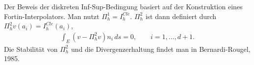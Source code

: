 \begin{beweis}
  Der Beweis der diskreten Inf-Sup-Bedingung basiert auf der Konstruktion eines Fortin-Interpolators. Man nutzt $\Pi_{h}^{1} = I_{h}^{Cle}$. $\Pi_{h}^{2}$ ist dann definiert durch $\Pi_{h}^{2}v(a_{i}) = I_{h}^{Cle}(a_{i})$,
  \begin{align*}
    \int_{E}(v - \Pi_{h}^{2}v)n_{i} \, ds = 0, \qquad i = 1, \dots, d+1. 
  \end{align*}
Die Stabilität von $\Pi_{h}^{2}$ und die Divergenzerhaltung findet man in Bernardi-Rougel, 1985. 
\end{beweis}
